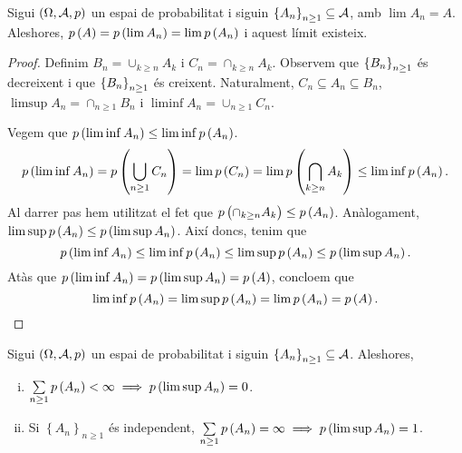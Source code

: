 \begin{prop}
    Sigui $\left(\Omega,\mathcal{A},p\right)$ un espai de probabilitat i siguin $\left\{ A_n\right\}_{n\geq1} \subseteq \mathcal{A}$, amb $\lim A_n=A$. Aleshores, $p\left( A\right) = p\left( \lim A_n\right) = \lim p \left( A_n\right)$ i aquest límit existeix.
\end{prop}
\begin{proof}
    Definim $B_n=\cup_{k\geq n}A_k$ i $C_n=\cap_{k\geq n}A_k$. Observem que $\left\{ B_n\right\}_{n\geq 1}$ és decreixent i que $\left\{ B_n\right\}_{n\geq 1}$ és creixent. Naturalment, $C_n\subseteq A_n\subseteq B_n$, $\limsup A_n = \cap_{n\geq 1} B_n$ i $\liminf A_n = \cup_{n\geq 1} C_n$.
    
    \noindent Vegem que $p\left(\liminf A_n\right)\leq\liminf p\left( A_n\right)$.
    \[
        p\left(\liminf A_n\right)=p\left(\bigcup_{n\geq 1} C_n\right) = \lim p\left( C_n\right)=\lim p\left( \bigcap_{k\geq n} A_k\right)\leq\liminf p\left( A_n\right).
    \]
    Al darrer pas hem utilitzat el fet que $p\left( \cap_{k\geq n} A_k\right)\leq p\left( A_n\right)$. Anàlogament, $\limsup p\left( A_n\right)\leq p\left(\limsup A_n\right)$. Així doncs, tenim que
    \[
        p\left(\liminf A_n\right)\leq\liminf p\left( A_n\right)\leq\limsup p\left( A_n\right)\leq p\left(\limsup A_n\right).
    \]
    Atàs que $p\left(\liminf A_n\right)=p\left(\limsup A_n\right)=p\left( A\right)$, concloem que 
    \[
        \liminf p\left( A_n\right)=\limsup p\left( A_n\right)=\lim p\left( A_n\right)=p\left( A\right).
    \]
\end{proof}
\begin{teolema}
    Sigui $\left(\Omega,\mathcal{A},p\right)$ un espai de probabilitat i siguin $\left\{ A_n\right\}_{n\geq1} \subseteq \mathcal{A}$. Aleshores,
    \begin{enumerate}[i)]
        \item $\sum\limits_{n\geq 1} p\left( A_n\right)<\infty\implies p\left(\limsup A_n\right)=0$.
        \item Si $\left\{ A_n\right\}_{n\geq1}$ és independent, $\sum\limits_{n\geq 1} p\left( A_n\right)=\infty\implies p\left(\limsup A_n\right)=1$.
    \end{enumerate}
\end{teolema}
